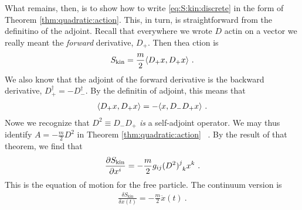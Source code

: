 What remains, then, is to show how to write \eqref{eq:S:kin:discrete} in the form of Theorem \ref{thm:quadratic:action}. This, in turn, is straightforward from the definitino of the adjoint. Recall that everywhere we wrote $D$ actin on a vector we really meant the \emph{forward} derivative, $D_+$. Then thea ction is
\begin{align}
    S_\textnormal{kin} = \frac{m}{2} \langle D_+x , D_+x \rangle  \ .
\end{align}
We also know that the adjoint of the forward derivative is the backward derivative, $D_+^\dag =- D_-^\dag$. By the definitin of adjoint, this means that 
\begin{align}
    \langle D_+x , D_+x \rangle = 
    - \langle x , D_- D_+x \rangle \ .
\end{align}
Nowe we recognize that $D^2 \equiv D_- D_+$ \emph{is} a self-adjoint operator. We may thus identify $A =- \frac{m}{2}D^2$ in Theorem \ref{thm:quadratic:action} \ . By the result of that theorem, we find that
\begin{align}
    \frac{\partial S_\text{kin}}{\partial x^i}
    = 
    - \frac{m}{2} g_{ij} (D^2)\aij{j}{k}x^k \ .
\end{align}
This is the equation of motion for the free particle. The continuum version is
\begin{align}
    \frac{\delta S_\text{kin}}{\delta x(t)}
    = - \frac{m}{2}\ddot x(t) \ .
\end{align}
